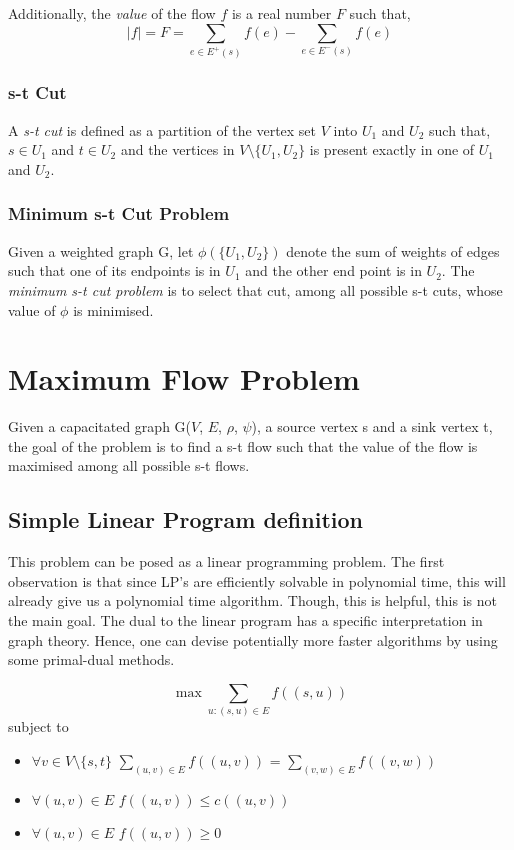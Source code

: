 \documentclass[BTech]{iitmdiss}
\begin{document}
	Additionally, the \textit{value} of the flow $f$ is a real number $F$ such that,
	$$|f| = F = \displaystyle\sum_{e \in E^+(s)} f(e)- \displaystyle\sum_{e \in E^-(s)} f(e)$$
	
      \subsubsection{s-t Cut}
	A \textit{s-t cut} is defined as a partition of the vertex set $V$ into $U_1$ and $U_2$ such that, $s \in U_1$ and $t \in U_2$ and the vertices
	in $V \setminus \{U_1, U_2 \}$ is present exactly in one of $U_1$ and $U_2$.
      
      \subsubsection{Minimum s-t Cut Problem}
	Given a weighted graph G, let $\phi(\{U_1,U_2\})$ denote the sum of weights of edges such that one of its endpoints is in $U_1$ and the other
	end point is in $U_2$. The \textit{minimum s-t cut problem} is to select that cut, among all possible s-t cuts, whose value of $\phi$ is minimised.
      \section{Maximum Flow Problem}
	Given a capacitated graph G($V$, $E$, $\rho$, $\psi$), a source vertex s and a sink vertex t, the goal of the problem is to find a s-t flow
	such that the value of the flow is maximised among all possible s-t flows. \\
	
	\subsection{Simple Linear Program definition}
	  This problem can be posed as a linear programming problem. The first observation is that since LP's are efficiently solvable in polynomial
	  time, this will already give us a polynomial time algorithm. Though, this is helpful, this is not the main goal. The dual to the linear
	  program has a specific interpretation in graph theory. Hence, one can devise potentially more faster algorithms by using some primal-dual
	  methods.
	  
	  $$\max \displaystyle\sum_{u:(s,u) \in E} f((s,u))$$
	  subject to
	  \begin{itemize}
	   \item
	      $\forall v \in V \setminus \{s,t\}$ $\displaystyle\sum_{(u,v) \in E} f((u,v))$ = $\displaystyle\sum_{(v,w) \in E} f((v,w))$
	   \item
	      $\forall (u,v) \in E$ $f((u,v)) \leq c((u,v))$
	   \item
	      $\forall(u,v) \in E$ $f((u,v)) \geq 0$
	      
	  \end{itemize}
	  
\end{document}

